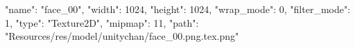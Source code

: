 {
  "name": "face_00",
  "width": 1024,
  "height": 1024,
  "wrap_mode": 0,
  "filter_mode": 1,
  "type": "Texture2D",
  "mipmap": 11,
  "path": "Resources/res/model/unitychan/face_00.png.tex.png"
}